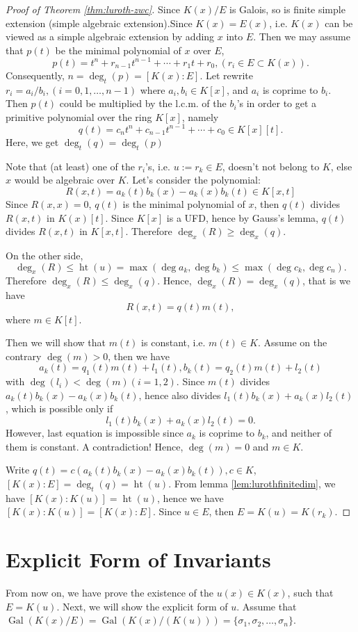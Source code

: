 \begin{proof}[Proof of Theorem \ref{thm:luroth-zwc}]
Since $K(x)/E$ is Galois, so is finite simple extension (simple algebraic extension).Since $K(x)=E(x)$, i.e. $K(x)$ can be viewed as a simple algebraic extension by adding $x$ into $E$. Then we may assume that $p(t)$ be the minimal polynomial of $x$ over $E$, $$p(t)=t^n+r_{n-1}t^{n-1}+\cdots+r_1t+r_0,(r_i\in E\subset K(x)).$$
Consequently, $n=\deg_t(p)=[K(x):E]$.
Let rewrite $r_i=a_i/b_i,(i=0,1,\dots,n-1)$ where $a_i,b_i\in K[x]$, and $a_i$ is coprime to $b_i$.  Then $p(t)$ could be multiplied by the l.c.m. of the $b_i$'s in order to get a primitive polynomial over the ring $K[x]$, namely $$q(t)=c_nt^n+c_{n-1}t^{n-1}+\cdots+c_0\in K[x][t].$$ Here, we get $\deg_t(q)=\deg_t(p)$

Note that (at least) one of the $r_i$'s, i.e. $u:=r_k\in E$, doesn't not belong to $K$, else $x$ would be algebraic over $K$. Let's consider the polynomial:
$$R(x,t)=a_k(t)b_k(x)-a_k(x)b_k(t)\in K[x,t]$$ 
Since $R(x,x)=0$, $q(t)$ is the minimal polynomial of $x$, then $q(t)$ divides 
$R(x,t)$ in $K(x)[t]$. Since $K[x]$ is a UFD, hence by Gauss's lemma, $q(t)$ divides $R(x,t)$ in $K[x,t]$. Therefore $\deg_x(R)\geq\deg_x(q)$. 

On the other side, $$\deg_x(R)\leq\operatorname{ht}(u)=\max(\deg a_k,\deg b_k)\leq\max(\deg c_k,\deg c_n).$$ Therefore $\deg_x(R)\leq\deg_x(q)$. Hence, $\deg_x(R)=\deg_x(q)$, that is we have $$R(x,t)=q(t)m(t),$$ where $m\in K[t]$.

Then we will show that $m(t)$ is constant, i.e. $m(t)\in K$. Assume on the contrary $\deg(m)>0$, then we have $$a_k(t)=q_1(t)m(t)+l_1(t),b_k(t)=q_2(t)m(t)+l_2(t)$$ with $\deg(l_i)<\deg(m)(i=1,2)$. Since $m(t)$ divides $a_k(t)b_k(x)-a_k(x)b_k(t)$, hence also divides  $l_1(t)b_k(x)+a_k(x)l_2(t)$, which is possible only if $$l_1(t)b_k(x)+a_k(x)l_2(t)=0.$$ However, last equation is impossible since $a_k$ is coprime to $b_k$, and neither of them is constant. A contradiction! Hence, $\deg(m)=0$ and $m\in K$.

Write $q(t)=c\left(a_k(t)b_k(x)-a_k(x)b_k(t)\right),c\in K$, $[K(x):E]=\deg_t(q)=\operatorname{ht}(u)$. From lemma \ref{lem:lurothfinitedim}, we have $[K(x):K(u)]=\operatorname{ht}(u)$, hence we have $[K(x):K(u)]=[K(x):E]$. Since $u\in E$, then $E=K(u)=K(r_k)$.
\end{proof}

\section{Explicit Form of Invariants}
From now on, we have prove the existence of the $u(x)\in K(x)$, such that $E=K(u)$. Next, we will show the explicit form of $u$. Assume that $\operatorname{Gal}(K(x)/E)=\operatorname{Gal}(K(x)/(K(u)))=\{\sigma_1,\sigma_2,\dots,\sigma_n\}$. 

